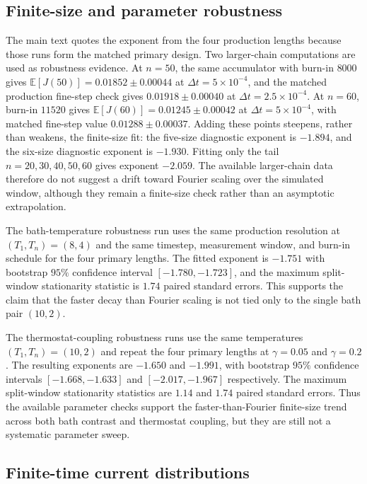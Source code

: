\documentclass[11pt,a4paper]{article}
\theoremstyle{definition}
\newcommand{\E}{\mathbb{E}}
\numberwithin{equation}{section}   %
\begin{document}
\subsection{Finite-size and parameter robustness}
\label{app:finite-size-robustness}

The main text quotes the exponent from the four production lengths because
those runs form the matched primary design. Two larger-chain computations are
used as robustness evidence. At $n=50$, the same accumulator with burn-in
$8000$ gives $\E[J(50)]=0.01852\pm0.00044$ at
$\Delta t=5\times10^{-4}$, and the matched production fine-step check gives
$0.01918\pm0.00040$ at $\Delta t=2.5\times10^{-4}$. At $n=60$, burn-in
$11520$ gives $\E[J(60)]=0.01245\pm0.00042$ at
$\Delta t=5\times10^{-4}$, with matched fine-step value
$0.01288\pm0.00037$. Adding these points steepens, rather than
weakens, the finite-size fit: the five-size diagnostic exponent is $-1.894$,
and the six-size diagnostic exponent is $-1.930$. Fitting only the tail
$n=20,30,40,50,60$ gives exponent $-2.059$. The available larger-chain data
therefore do not suggest a drift toward Fourier scaling over the simulated
window, although they remain a finite-size check rather than an asymptotic
extrapolation.

The bath-temperature robustness run uses the same production resolution at
$(T_1,T_n)=(8,4)$ and the same timestep, measurement window, and burn-in
schedule for the four primary lengths. The fitted exponent is $-1.751$ with bootstrap
$95\%$ confidence interval $[-1.780,-1.723]$, and the maximum split-window
stationarity statistic is $1.74$ paired standard errors. This supports the
claim that the faster decay than Fourier scaling is not tied only to the
single bath pair $(10,2)$.

The thermostat-coupling robustness runs use the same temperatures
$(T_1,T_n)=(10,2)$ and repeat the four primary lengths at $\gamma=0.05$ and
$\gamma=0.2$. The resulting exponents are $-1.650$ and $-1.991$, with
bootstrap $95\%$ confidence intervals $[-1.668,-1.633]$ and
$[-2.017,-1.967]$ respectively. The maximum split-window stationarity
statistics are $1.14$ and $1.74$ paired standard errors. Thus the available
parameter checks support the faster-than-Fourier finite-size trend across
both bath contrast and thermostat coupling, but they are still not a
systematic parameter sweep.

\subsection{Finite-time current distributions}
\label{app:current-distributions}
\end{document}
